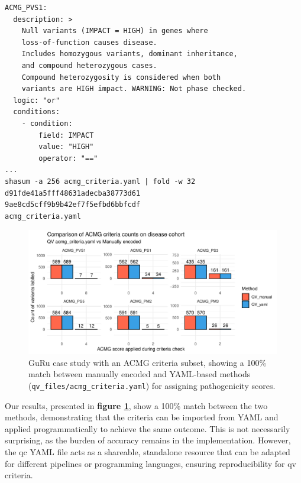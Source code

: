 \begin{tcolorbox}[
    colback=white!0,  %
    colframe=black,  %
    boxrule=1pt,  %
    arc=1mm,  %
    outer arc=1mm,
   title=\textbf{\refstepcounter{myboxcounter}\label{box:acmg_criteria_yaml}Box \themyboxcounter: qv\_files/acmg\_criteria.yaml}
]

\begin{verbatim}
ACMG_PVS1:
  description: >
    Null variants (IMPACT = HIGH) in genes where 
    loss-of-function causes disease.
    Includes homozygous variants, dominant inheritance, 
    and compound heterozygous cases.
    Compound heterozygosity is considered when both 
    variants are HIGH impact. WARNING: Not phase checked.
  logic: "or"
  conditions:
    - condition:
        field: IMPACT
        value: "HIGH"
        operator: "=="
...
shasum -a 256 acmg_criteria.yaml | fold -w 32
d91fde41a5fff48631adecba38773d61
9ae8cd5cff9b9b42ef7f5efbd6bbfcdf
acmg_criteria.yaml
\end{verbatim}
\end{tcolorbox}


\begin{figure}[!h]
\centering
\includegraphics[width=0.99\textwidth]{./images/Guru_singlecase_validation_of_yaml_vs_manual.pdf}
\caption{GuRu case study with an ACMG criteria subset, showing a 100\% match between manually encoded and YAML-based methods (\texttt{qv\_files/acmg\_criteria.yaml}) for assigning pathogenicity scores.}
\label{fig:guru_case_study_result}
\end{figure}

Our results, presented in \textbf{figure \ref{fig:guru_case_study_result}}, show a 100\% match between the two methods, demonstrating that the criteria can be imported from YAML and applied programmatically to achieve the same outcome. This is not necessarily surprising, as the burden of accuracy remains in the implementation. However, the \ac{qc} YAML file acts as a shareable, standalone resource that can be adapted for different pipelines or programming languages, ensuring reproducibility for \ac{qv} criteria.

